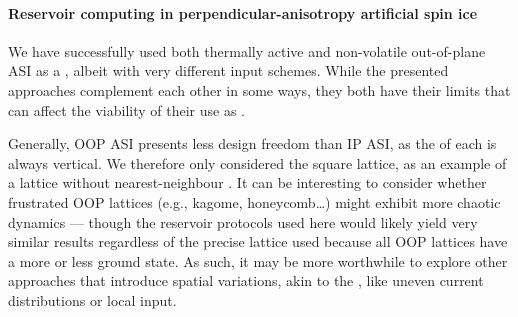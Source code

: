 \paragraph{Reservoir computing in perpendicular-anisotropy artificial spin ice}
We have successfully used both thermally active and non-volatile out-of-plane ASI as a , albeit with very different input schemes.
While the presented approaches complement each other in some ways, they both have their limits that can affect the viability of their use as . \\\par

Generally, OOP ASI presents less design freedom than IP ASI, as the  of each  is always vertical.
We therefore only considered the square lattice, as an example of a lattice without nearest-neighbour .
It can be interesting to consider whether frustrated OOP lattices (e.g., kagome, honeycomb\dots) might exhibit more chaotic dynamics --- though the reservoir protocols used here would likely yield very similar results regardless of the precise lattice used because all OOP lattices have a more or less  ground state.
As such, it may be more worthwhile to explore other approaches that introduce spatial variations, akin to the , like uneven current distributions or local input. \\\par

